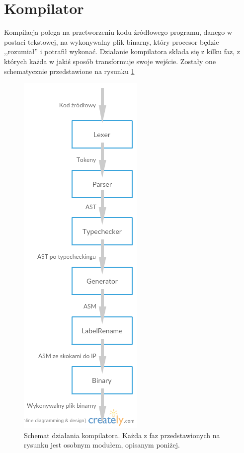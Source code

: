 \section{Kompilator}

Kompilacja polega na przetworzeniu kodu źródłowego programu, danego w postaci tekstowej, na wykonywalny plik binarny, który procesor będzie ,,rozumiał'' i potrafił wykonać. Działanie kompilatora składa się z kilku faz, z których każda w jakiś sposób transformuje swoje wejście. Zostały one schematycznie przedstawione na rysunku \ref{fig:CompilerOverview}

\begin{figure}
  \begin{center}
    \includegraphics[scale=0.75]{images/CompilerOverview.png}
    \caption{Schemat działania kompilatora. Każda z faz przedstawionych na rysunku jest osobnym modułem, opisanym poniżej.}
    \label{fig:CompilerOverview}
  \end{center}
\end{figure}

